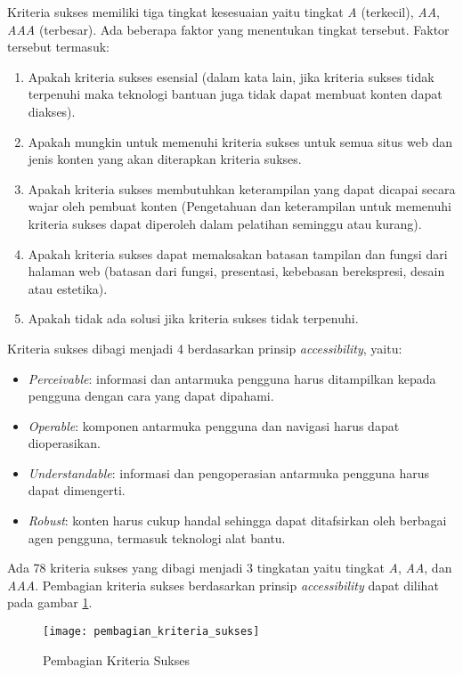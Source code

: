 Kriteria sukses memiliki tiga tingkat kesesuaian yaitu tingkat \textit{A} (terkecil), \textit{AA}, \textit{AAA} (terbesar). Ada beberapa faktor yang menentukan tingkat tersebut. Faktor tersebut termasuk:

\begin{enumerate}
	\item Apakah kriteria sukses esensial (dalam kata lain, jika kriteria sukses tidak terpenuhi maka teknologi bantuan juga tidak dapat membuat konten dapat diakses).
	\item Apakah mungkin untuk memenuhi kriteria sukses untuk semua situs web dan jenis konten yang akan diterapkan kriteria sukses.
	\item Apakah kriteria sukses membutuhkan keterampilan yang dapat dicapai secara wajar oleh pembuat konten (Pengetahuan dan keterampilan untuk memenuhi kriteria sukses dapat diperoleh dalam pelatihan seminggu atau kurang).
	\item Apakah kriteria sukses dapat memaksakan batasan tampilan dan fungsi dari halaman web (batasan dari fungsi, presentasi, kebebasan berekspresi, desain atau estetika).
	\item Apakah tidak ada solusi jika kriteria sukses tidak terpenuhi.
\end{enumerate}

Kriteria sukses dibagi menjadi 4 berdasarkan prinsip \textit{accessibility}, yaitu:
\begin{itemize}
	\item \textit{Perceivable}: informasi dan antarmuka pengguna harus ditampilkan kepada pengguna dengan cara yang dapat dipahami.
	\item \textit{Operable}: komponen antarmuka pengguna dan navigasi harus dapat dioperasikan.
	\item \textit{Understandable}: informasi dan pengoperasian antarmuka pengguna harus dapat dimengerti.
	\item \textit{Robust}: konten harus cukup handal sehingga dapat ditafsirkan oleh berbagai agen pengguna, termasuk teknologi alat bantu.
\end{itemize}

Ada 78 kriteria sukses yang dibagi menjadi 3 tingkatan yaitu tingkat \textit{A}, \textit{AA}, dan \textit{AAA}. Pembagian kriteria sukses berdasarkan prinsip \textit{accessibility} dapat dilihat pada gambar \ref{fig:pembagian_kriteria_sukses}.

\begin{figure}[H]
	\centering  
	\texttt{[image: pembagian\_kriteria\_sukses]}  
	\caption[Pembagian Kriteria Sukses]{Pembagian Kriteria Sukses} 
	\label{fig:pembagian_kriteria_sukses} 
\end{figure}

